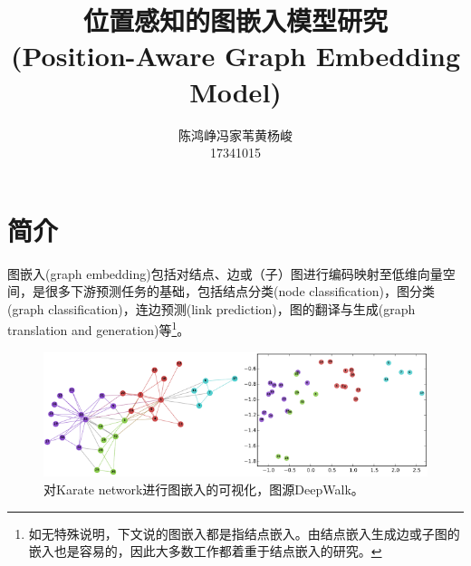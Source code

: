 \documentclass[reportComp]{thesis}
\title{位置感知的图嵌入模型研究\\(Position-Aware Graph Embedding Model)}
\author{陈鸿峥\qquad 冯家苇\qquad 黄杨峻\\%
{\small 17341015\quad 17341035\quad 17341059}}
\begin{document}
\maketitle

\section{简介}
图嵌入(graph embedding)包括对结点、边或（子）图进行编码映射至低维向量空间，是很多下游预测任务的基础，包括结点分类(node classification)，图分类(graph classification)，连边预测(link prediction)，图的翻译与生成(graph translation and generation)等\footnote{如无特殊说明，下文说的图嵌入都是指结点嵌入。由结点嵌入生成边或子图的嵌入也是容易的，因此大多数工作都着重于结点嵌入的研究。}。
\begin{figure}[H]
\centering
\includegraphics[width=0.8\linewidth]{fig/graph_embedding_intro.png}
\caption{对Karate network进行图嵌入的可视化，图源DeepWalk\cite{perozzi:deepwalk_kdd_2014}。}
\end{figure}
\end{document}
